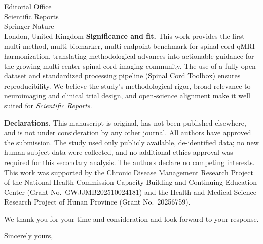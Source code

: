\documentclass[11pt,a4paper]{letter}
\begin{document}
\begin{letter}{Editorial Office\\
Scientific Reports\\
Springer Nature\\
London, United Kingdom}
\textbf{Significance and fit.} This work provides the first multi-method, multi-biomarker, multi-endpoint benchmark for spinal cord qMRI harmonization, translating methodological advances into actionable guidance for the growing multi-center spinal cord imaging community. The use of a fully open dataset and standardized processing pipeline (Spinal Cord Toolbox) ensures reproducibility. We believe the study's methodological rigor, broad relevance to neuroimaging and clinical trial design, and open-science alignment make it well suited for \textit{Scientific Reports}.

\textbf{Declarations.} This manuscript is original, has not been published elsewhere, and is not under consideration by any other journal. All authors have approved the submission. The study used only publicly available, de-identified data; no new human subject data were collected, and no additional ethics approval was required for this secondary analysis. The authors declare no competing interests. This work was supported by the Chronic Disease Management Research Project of the National Health Commission Capacity Building and Continuing Education Center (Grant No.~GWJJMB202510024181) and the Health and Medical Science Research Project of Hunan Province (Grant No.~20256759).

We thank you for your time and consideration and look forward to your response.

\closing{Sincerely yours,}

\end{letter}
\end{document}
